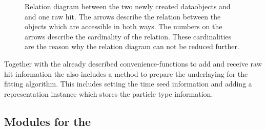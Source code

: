 \begin{figure}
  \centering
  \caption[Relation diagram between \RecoTrack, \Hit and raw hits.]{Relation diagram between the two newly created dataobjects \RecoTrack and \Hit and one raw hit. The arrows describe the relation between the objects which are accessible in both ways. The numbers on the arrows describe the cardinality of the relation. These cardinalities are the reason why the relation diagram can not be reduced further.}
  \label{fig-reco-hit-relation}
\end{figure}

Together with the already described convenience-functions to add and receive raw hit information the \RecoTrack also includes a method to prepare the underlaying \Track for the fitting algorithm. This includes setting the time seed information and adding a representation instance which stores the particle type information.

\subsection{Modules for the \RecoTrack}


